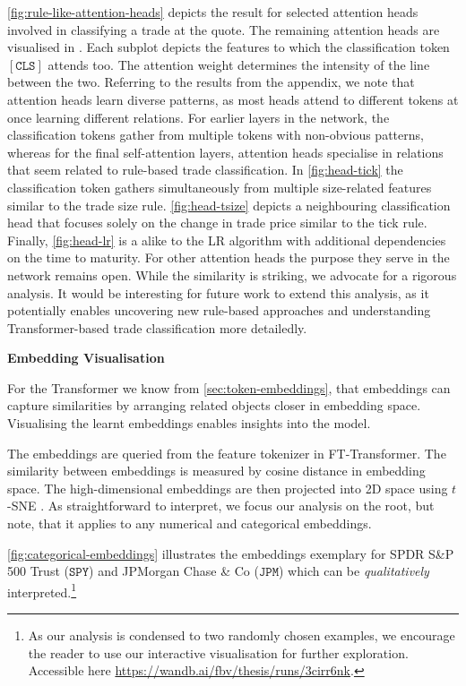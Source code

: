 \cref{fig:rule-like-attention-heads} depicts the result for selected attention heads involved in classifying a trade at the quote. The remaining attention heads are visualised in . Each subplot depicts the features to which the classification token $\mathtt{[CLS]}$ attends too. The attention weight determines the intensity of the line between the two. Referring to the results from the appendix, we note that attention heads learn diverse patterns, as most heads attend to different tokens at once learning different relations. For earlier layers in the network, the classification tokens gather from multiple tokens with non-obvious patterns, whereas for the final self-attention layers, attention heads specialise in relations that seem related to rule-based trade classification. In \cref{fig:head-tick} the classification token gathers simultaneously from multiple size-related features similar to the trade size rule. \cref{fig:head-tsize} depicts a neighbouring classification head that focuses solely on the change in trade price similar to the tick rule. Finally, \cref{fig:head-lr} is a alike to the \gls{LR} algorithm with additional dependencies on the time to maturity. For other attention heads the purpose they serve in the network remains open. While the similarity is striking, we advocate for a rigorous analysis. It would be interesting for future work to extend this analysis, as it potentially enables uncovering new rule-based approaches and understanding Transformer-based trade classification more detailedly.

\textbf{Embedding Visualisation}

For the Transformer we know from \cref{sec:token-embeddings}, that embeddings can capture similarities by arranging related objects closer in embedding space. Visualising the learnt embeddings enables insights into the model.

The embeddings are queried from the feature tokenizer in FT-Transformer. The similarity between embeddings is measured by cosine distance in embedding space. The high-dimensional embeddings are then projected into 2D space using $t$-SNE \autocite[][2587]{vandermaatenVisualizingDataUsing2008}. As straightforward to interpret, we focus our analysis on the root, but note, that it applies to any numerical and categorical embeddings.

\cref{fig:categorical-embeddings} illustrates the embeddings exemplary for SPDR S\&P 500 Trust ($\mathtt{SPY}$) and JPMorgan Chase \& Co ($\mathtt{JPM}$) which can be \emph{qualitatively} interpreted.\footnote{As our analysis is condensed to two randomly chosen examples, we encourage the reader to use our interactive visualisation for further exploration. Accessible here \url{https://wandb.ai/fbv/thesis/runs/3cirr6nk}.}

